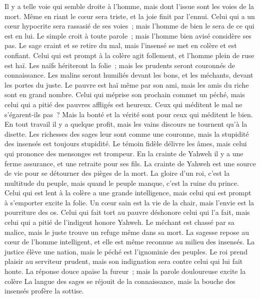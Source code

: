 \begin{multicols}{2}
Il y a telle voie qui semble droite à l'homme, mais dont l'issue sont les voies de la mort.
Même en riant le cœur sera triste, et la joie finit par l'ennui.
Celui qui a un cœur hypocrite sera rassasié de ses voies~; mais l'homme de bien le sera de ce qui est en lui.
Le simple croit à toute parole~; mais l'homme bien avisé considère ses pas.
Le sage craint et se retire du mal, mais l'insensé se met en colère et est confiant.
Celui qui est prompt à la colère agit follement, et l'homme plein de ruse est haï.
Les naïfs hériteront la folie~; mais les prudents seront couronnés de connaissance.
Les malins seront humiliés devant les bons, et les méchants, devant les portes du juste.
Le pauvre est haï même par son ami, mais les amis du riche sont en grand nombre.
Celui qui méprise son prochain commet un péché, mais celui qui a pitié des pauvres affligés est heureux.
Ceux qui méditent le mal ne s'égarent-ils pas~? Mais la bonté et la vérité sont pour ceux qui méditent le bien.
En tout travail il y a quelque profit, mais les vains discours ne tournent qu'à la disette.
Les richesses des sages leur sont comme une couronne, mais la stupidité des insensés est toujours stupidité.
Le témoin fidèle délivre les âmes, mais celui qui prononce des mensonges est trompeur.
En la crainte de Yahweh il y a une ferme assurance, et une retraite pour ses fils.
La crainte de Yahweh est une source de vie pour se détourner des pièges de la mort.
La gloire d'un roi, c'est la multitude du peuple, mais quand le peuple manque, c'est la ruine du prince.
Celui qui est lent à la colère a une grande intelligence, mais celui qui est prompt à s'emporter excite la folie.
Un cœur sain est la vie de la chair, mais l'envie est la pourriture des os.
Celui qui fait tort au pauvre déshonore celui qui l'a fait, mais celui qui a pitié de l'indigent honore Yahweh.
Le méchant est chassé par sa malice, mais le juste trouve un refuge même dans sa mort.
La sagesse repose au cœur de l'homme intelligent, et elle est même reconnue au milieu des insensés.
La justice élève une nation, mais le péché est l'ignominie des peuples.
Le roi prend plaisir au serviteur prudent, mais son indignation sera contre celui qui lui fait honte.
\VerseOne{}La réponse douce apaise la fureur~; mais la parole douloureuse excite la colère
La langue des sages se réjouit de la connaissance, mais la bouche des insensés profère la sottise.

\end{multicols}
